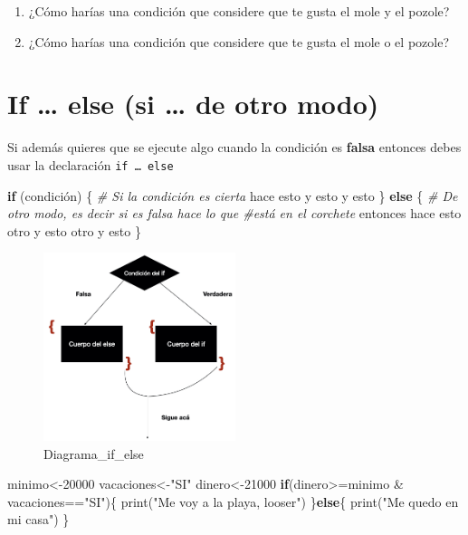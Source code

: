 \documentclass[
]{book}
\newenvironment{Shaded}{\begin{snugshade}}{\end{snugshade}}
\newcommand{\CommentTok}[1]{\textcolor[rgb]{0.56,0.35,0.01}{\textit{#1}}}
\newcommand{\ControlFlowTok}[1]{\textcolor[rgb]{0.13,0.29,0.53}{\textbf{#1}}}
\newcommand{\DecValTok}[1]{\textcolor[rgb]{0.00,0.00,0.81}{#1}}
\newcommand{\FunctionTok}[1]{\textcolor[rgb]{0.00,0.00,0.00}{#1}}
\newcommand{\NormalTok}[1]{#1}
\newcommand{\OtherTok}[1]{\textcolor[rgb]{0.56,0.35,0.01}{#1}}
\newcommand{\SpecialCharTok}[1]{\textcolor[rgb]{0.00,0.00,0.00}{#1}}
\newcommand{\StringTok}[1]{\textcolor[rgb]{0.31,0.60,0.02}{#1}}
\begin{document}
\begin{enumerate}
\def\labelenumi{\arabic{enumi}.}
\item
  ¿Cómo harías una condición que considere que te gusta el mole y el pozole?
\item
  ¿Cómo harías una condición que considere que te gusta el mole o el pozole?
\end{enumerate}

\hypertarget{if-else-si-de-otro-modo}{%
\section{If \ldots{} else (si \ldots{} de otro modo)}\label{if-else-si-de-otro-modo}}

Si además quieres que se ejecute algo cuando la condición es \textbf{falsa} entonces debes usar la declaración \texttt{if\ …\ else}

\begin{Shaded}
\begin{Highlighting}[]
\ControlFlowTok{if}\NormalTok{ (condición) \{ }\CommentTok{\# Si la condición es cierta}
\NormalTok{hace esto}
\NormalTok{y esto}
\NormalTok{y esto}
\NormalTok{\} }\ControlFlowTok{else}\NormalTok{ \{ }\CommentTok{\# De otro modo, es decir si es falsa hace lo que \#está en el corchete}
\NormalTok{entonces hace esto otro}
\NormalTok{y esto otro}
\NormalTok{y esto}
\NormalTok{\}}
\end{Highlighting}
\end{Shaded}

\begin{figure}
\hypertarget{id}{%
\centering
\includegraphics[width=0.5\textwidth,height=0.5\textheight]{If_else.001.jpeg}
\caption{Diagrama\_if\_else}\label{id}
}
\end{figure}

\begin{Shaded}
\begin{Highlighting}[]
\NormalTok{minimo}\OtherTok{\textless{}{-}}\DecValTok{20000}
\NormalTok{vacaciones}\OtherTok{\textless{}{-}}\StringTok{"SI"}
\NormalTok{dinero}\OtherTok{\textless{}{-}}\DecValTok{21000}
\ControlFlowTok{if}\NormalTok{(dinero}\SpecialCharTok{\textgreater{}=}\NormalTok{minimo }\SpecialCharTok{\&}\NormalTok{ vacaciones}\SpecialCharTok{==}\StringTok{"SI"}\NormalTok{)\{}
  \FunctionTok{print}\NormalTok{(}\StringTok{"Me voy a la playa, looser"}\NormalTok{)}
\NormalTok{\}}\ControlFlowTok{else}\NormalTok{\{}
  \FunctionTok{print}\NormalTok{(}\StringTok{"Me quedo en mi casa"}\NormalTok{)}
\NormalTok{\}}
\end{Highlighting}
\end{Shaded}
\end{document}
